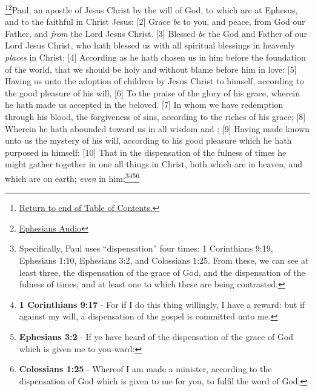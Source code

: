 \footnote{\textcolor[cmyk]{0.99998,1,0,0}{\hyperlink{TOC}{Return to end of Table of Contents.}}}\footnote{\href{https://www.audioverse.org/english/audiobibles/books/ENGKJV/N/Eph/1}{\textcolor[cmyk]{0.99998,1,0,0}{Ephesians Audio}}}\textcolor[cmyk]{0.99998,1,0,0}{Paul, an apostle of Jesus Christ by the will of God, to  which are at Ephesus, and to the faithful in Christ Jesus:}
[2] \textcolor[cmyk]{0.99998,1,0,0}{Grace \emph{be} to you, and peace, from God our Father, and \emph{from} the Lord Jesus Christ.}
[3] \textcolor[cmyk]{0.99998,1,0,0}{Blessed \emph{be} the God and Father of our Lord Jesus Christ, who hath blessed us with all spiritual blessings in heavenly \emph{places} in Christ:}
[4] \textcolor[cmyk]{0.99998,1,0,0}{According as he hath chosen us in him before the foundation of the world, that we should be holy and without blame before him in love:}
[5] \textcolor[cmyk]{0.99998,1,0,0}{Having  us unto the adoption of children by Jesus Christ to himself, according to the good pleasure of his will,}
[6] \textcolor[cmyk]{0.99998,1,0,0}{To the praise of the glory of his grace, wherein he hath made us accepted in the beloved.}
[7] \textcolor[cmyk]{0.99998,1,0,0}{In whom we have redemption through his blood, the forgiveness of sins, according to the riches of his grace;}
[8] \textcolor[cmyk]{0.99998,1,0,0}{Wherein he hath abounded toward us in all wisdom and ;}
[9] \textcolor[cmyk]{0.99998,1,0,0}{Having made known unto us the mystery of his will, according to his good pleasure which he hath purposed in himself:}
[10] \textcolor[cmyk]{0.99998,1,0,0}{That in the dispensation of the fulness of times he might gather together in one all things in Christ, both which are in heaven, and which are on earth; \emph{even} in him:}\footnote{Specifically, Paul uses ``dispensation'' four times: 1 Corinthians 9:19, Ephesians 1:10, Ephesians 3:2, and Colossians 1:25. From these, we can see at least three, the dispensation of the grace of God, and the dispensation of the fulness of times, and at least one to which these are being contrasted.}\footnote{\textbf{1 Corinthians 9:17} - For if I do this thing willingly, I have a reward: but if against my will, a dispensation of the gospel is committed unto me.}\footnote{\textbf{Ephesians 3:2} - If ye have heard of the dispensation of the grace of God which is given me to you-ward:}\footnote{\textbf{Colossians 1:25} - Whereof I am made a minister, according to the dispensation of God which is given to me for you, to fulfil the word of God;}
